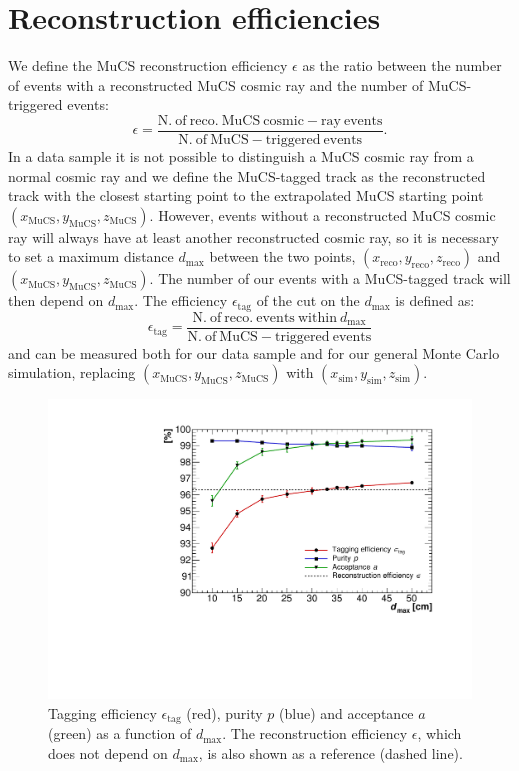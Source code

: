\documentclass[a4paper]{scrartcl}
\begin{document}
\section{Reconstruction efficiencies}\label{sec:reco}

We define the MuCS reconstruction efficiency $\epsilon$ as the ratio between the number of events with a reconstructed MuCS cosmic ray and the number of MuCS-triggered events:
\begin{equation}\label{eq:eff}
  \epsilon = \frac{\mathrm{N.~of~reco.~MuCS~cosmic-ray~events}}{\mathrm{N.~of~MuCS-triggered~events}}.
\end{equation}
In a data sample it is not possible to distinguish a MuCS cosmic ray from a normal cosmic ray and we define the MuCS-tagged track as the reconstructed track with the closest starting point to the extrapolated MuCS starting point $(x_{\mathrm{MuCS}},y_{\mathrm{MuCS}},z_{\mathrm{MuCS}})$. However, events without a reconstructed MuCS cosmic ray will always have at least another reconstructed cosmic ray, so it is necessary to set a maximum distance $d_{\mathrm{max}}$ between the two points, $(x_{\mathrm{reco}},y_{\mathrm{reco}},z_{\mathrm{reco}})$ and $(x_{\mathrm{MuCS}},y_{\mathrm{MuCS}},z_{\mathrm{MuCS}})$. The number of our events with a MuCS-tagged track will then depend on $d_{\mathrm{max}}$. The efficiency $\epsilon_{\mathrm{tag}}$ of the cut on the $d_{\mathrm{max}}$ is defined as:
\begin{equation}
  \epsilon_{\mathrm{tag}}=\frac{\mathrm{N.~of~reco.~events~within~}d_{\mathrm{max}}}{\mathrm{N.~of~MuCS-triggered~events}}
\end{equation}
and can be measured both for our data sample and for our general Monte Carlo simulation, replacing $(x_{\mathrm{MuCS}},y_{\mathrm{MuCS}},z_{\mathrm{MuCS}})$ with $(x_{\mathrm{sim}},y_{\mathrm{sim}},z_{\mathrm{sim}})$.


\begin{figure}[htbp]
  \begin{center}
    \includegraphics[width=0.7\linewidth]{figures/purity.pdf}
    \caption{Tagging efficiency $\epsilon_{\mathrm{tag}}$ (red), purity $p$ (blue) and acceptance $a$ (green) as a function of $d_{\mathrm{max}}$. The reconstruction efficiency $\epsilon$, which does not depend on $d_{\mathrm{max}}$, is also shown as a reference (dashed line).} \label{fig:purity}
  \end{center}
\end{figure}
\end{document}
